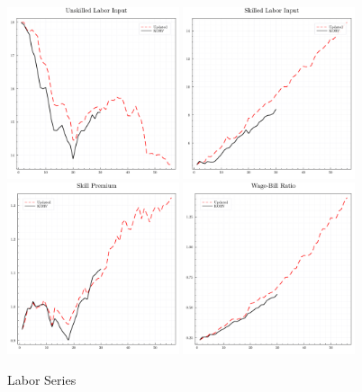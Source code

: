 \documentclass[12pt]{article}
\begin{document}
\begin{figure}
 \centering
 \includegraphics[width=0.45\textwidth]{../images/labor_input_unskilled_doc.pdf}
 \hspace*{0.05\textwidth}
 \includegraphics[width=0.45\textwidth]{../images/labor_input_skilled_doc.pdf}
 \vfill
 \includegraphics[width=0.45\textwidth]{../images/sp_doc.pdf}
 \hspace*{0.05\textwidth}
 \includegraphics[width=0.45\textwidth]{../images/wbr_doc.pdf}
 \caption{\label{fig:labor_series} Labor Series}
\end{figure}
\end{document}
